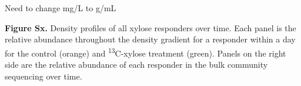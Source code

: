 Need to change mg/L to g/mL

\textbf{Figure Sx.} Density profiles of all xylose responders over time. Each panel is the relative abundance throughout the density gradient for a responder within a day for the control (orange) and \textsuperscript{13}C-xylose treatment (green). Panels on the right side are the relative abundance of each responder in the bulk community sequencing over time.  